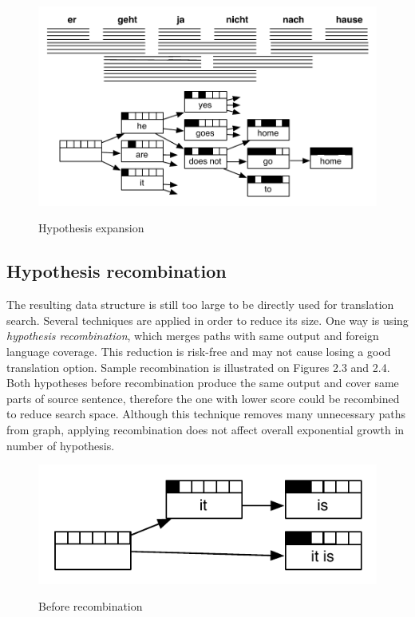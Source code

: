 \begin{figure}
 \centering 
 \includegraphics{g/decoding-step5.pdf}
 \caption{Hypothesis expansion}
 \caption*{\textit{\cite{Koehn2009a}}}
\end{figure}

\subsection{Hypothesis recombination}

The resulting data structure is still too large to be directly used for translation search. Several techniques are applied in order to reduce its size. One way is using \emph{hypothesis recombination}, which merges paths with same output and foreign language coverage. This reduction is risk-free and may not cause losing a good translation option. Sample recombination is illustrated on Figures 2.3 and 2.4. Both hypotheses before recombination produce the same output and cover same parts of source sentence, therefore the one with lower score could be recombined to reduce search space. Although this technique removes many unnecessary paths from graph, applying recombination does not affect overall exponential growth in number of hypothesis. 

\begin{figure}
 \centering 
 \includegraphics{g/recombination-example1.pdf}
 \caption{Before recombination}
 \caption*{\textit{\cite{Koehn2009a}}}
\end{figure}


